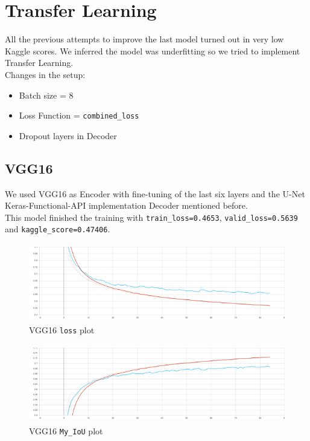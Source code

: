 \documentclass{article}
\begin{document}
	\section{Transfer Learning}
		
		All the previous attempts to improve the last model turned out in very low Kaggle scores. We inferred the model was underfitting so we tried to implement Transfer Learning. \\
		Changes in the setup:
		
		\begin{itemize}
			\item Batch size = 8
			\item Loss Function = \texttt{combined\_loss}
			\item Dropout layers in Decoder
		\end{itemize}
		
		\subsection{VGG16}
			
			We used VGG16 as Encoder with fine-tuning of the last six layers and the U-Net Keras-Functional-API implementation Decoder mentioned before. \\
			This model finished the training with \texttt{train\_loss=0.4653}, \texttt{valid\_loss=0.5639} and \texttt{kaggle\_score=0.47406}.
			
		\begin{figure}[H]
			\centering
			\includegraphics[height=3.4cm, keepaspectratio]{VGG16_Dec14_16-52-56_epoch_loss.jpg}
			\caption{VGG16 \texttt{loss} plot}
		\end{figure}
	
		\begin{figure}[H]
			\centering
			\includegraphics[height=3.4cm, keepaspectratio]{VGG16_Dec14_16-52-56_epoch_my_IoU}
			\caption{VGG16 \texttt{My\_IoU} plot}
		\end{figure}
			
\end{document}
